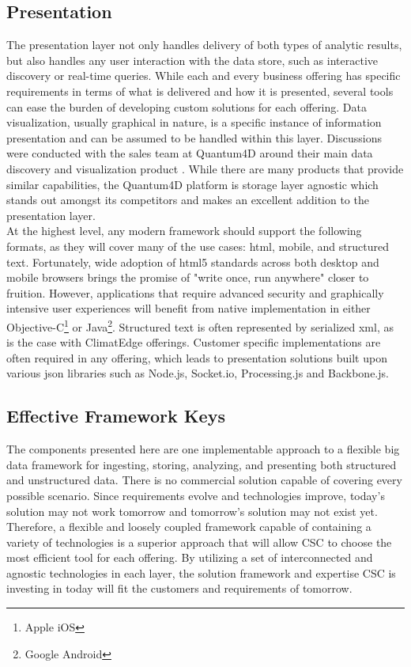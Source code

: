 \subsection{Presentation}
The presentation layer not only handles delivery of both types of analytic results, but also handles any user interaction with the data store, such as interactive discovery or real-time queries. While each and every business offering has specific requirements in terms of what is delivered and how it is presented, several tools can ease the burden of developing custom solutions for each offering. Data visualization, usually graphical in nature, is a specific instance of information presentation and can be assumed to be handled within this layer. Discussions were conducted with the sales team at Quantum4D around their main data discovery and visualization product \cite{quantum}. While there are many products that provide similar capabilities, the Quantum4D platform is storage layer agnostic which stands out amongst its competitors and makes an excellent addition to the presentation layer.\\

At the highest level, any modern framework should support the following formats, as they will cover many of the use cases: \gls{html}, mobile, and structured text. Fortunately, wide adoption of \gls{html}5 standards across both desktop and mobile browsers brings the promise of "write once, run anywhere" closer to fruition. However, applications that require advanced security and graphically intensive user experiences will benefit from native implementation in either Objective-C\footnote{Apple iOS} or Java\footnote{Google Android}. Structured text is often represented by serialized \gls{xml}, as is the case with ClimatEdge offerings. Customer specific implementations are often required in any offering, which leads to presentation solutions built upon various \gls{json} libraries such as Node.js, Socket.io, Processing.js and Backbone.js.
\subsection{Effective Framework Keys}
The components presented here are one implementable approach to a flexible big data framework for ingesting, storing, analyzing, and presenting both structured and unstructured data. There is no commercial solution capable of covering every possible scenario. Since requirements evolve and technologies improve, today's solution may not work tomorrow and tomorrow's solution may not exist yet. Therefore, a flexible and loosely coupled framework capable of containing a variety of technologies is a superior approach that will allow \textsc{CSC} to choose the most efficient tool for each offering. By utilizing a set of interconnected and agnostic technologies in each layer, the solution framework and expertise \textsc{CSC} is investing in today will fit the customers and requirements of tomorrow.